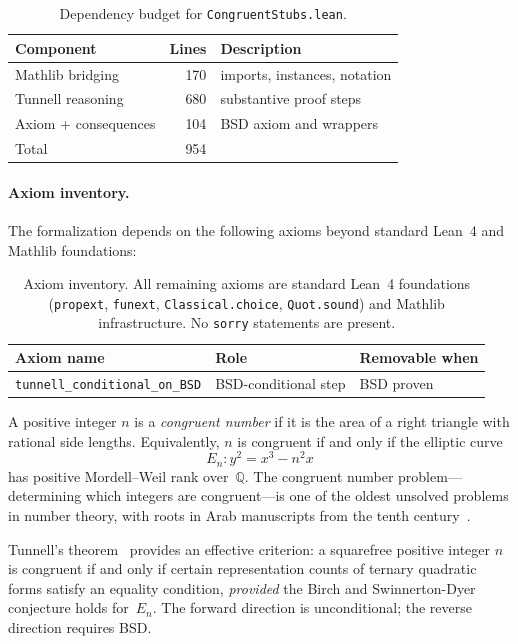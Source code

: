 \documentclass[11pt,a4paper]{article}
\theoremstyle{definition}
\newcommand{\Q}{\mathbb{Q}}
\newcommand{\En}{E_n}
\begin{document}
\begin{table}[ht]
\centering
\begin{tabular}{lrl}
\hline
Component & Lines & Description \\
\hline
Mathlib bridging      & 170 &
  imports, instances, notation \\
Tunnell reasoning     & 680 &
  substantive proof steps \\
Axiom + consequences  & 104 &
  BSD axiom and wrappers \\
\hline
Total                 & 954 & \\
\hline
\end{tabular}
\caption{Dependency budget for \texttt{CongruentStubs.lean}.}
\label{tab:depbudget}
\end{table}

\paragraph{Axiom inventory.}
The formalization depends on the following axioms beyond standard
Lean~4 and Mathlib foundations:

\begin{table}[ht]
\centering
\begin{tabular}{lll}
\hline
Axiom name & Role & Removable when \\
\hline
\texttt{tunnell\_conditional\_on\_BSD}
  & BSD-conditional step & BSD proven \\
\hline
\end{tabular}
\caption{Axiom inventory.  All remaining axioms are standard Lean~4
foundations (\texttt{propext}, \texttt{funext},
\texttt{Classical.choice}, \texttt{Quot.sound}) and Mathlib
infrastructure.  No \texttt{sorry} statements are present.}
\label{tab:axiom-inventory}
\end{table}

\medskip

A positive integer $n$ is a \emph{congruent number} if it is the area
of a right triangle with rational side lengths.  Equivalently, $n$ is
congruent if and only if the elliptic curve
\[
  \En : y^2 = x^3 - n^2 x
\]
has positive Mordell--Weil rank over~$\Q$.  The congruent number
problem---determining which integers are congruent---is one of the
oldest unsolved problems in number theory, with roots in Arab
manuscripts from the tenth century~\cite{Koblitz1993}.

Tunnell's theorem~\cite{Tunnell1983} provides an effective criterion:
a squarefree positive integer $n$ is congruent if and only if certain
representation counts of ternary quadratic forms satisfy an equality
condition, \emph{provided} the Birch and Swinnerton-Dyer conjecture
holds for~$\En$.  The forward direction is unconditional; the reverse
direction requires BSD.
\end{document}
